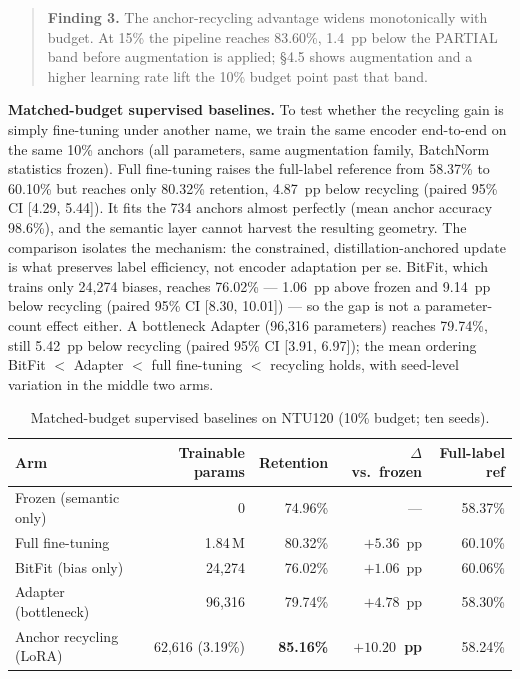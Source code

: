 \documentclass[preprint,12pt,number]{elsarticle}
\begin{document}
\begin{quote}
\textbf{Finding 3.} The anchor-recycling advantage widens monotonically with budget. At
15\% the pipeline reaches 83.60\%, 1.4~pp below the PARTIAL band before
augmentation is applied; \S4.5 shows augmentation and a higher learning
rate lift the 10\% budget point past that band.
\end{quote}

\textbf{Matched-budget supervised baselines.} To test whether the recycling gain
is simply fine-tuning under another name, we train the same encoder
end-to-end on the same 10\% anchors (all parameters, same augmentation
family, BatchNorm statistics frozen). Full fine-tuning raises the
full-label reference from 58.37\% to 60.10\% but reaches only 80.32\%
retention, 4.87~pp below recycling (paired 95\% CI [4.29, 5.44]). It fits the
734 anchors almost perfectly (mean anchor accuracy 98.6\%), and the semantic
layer cannot harvest the resulting geometry. The comparison isolates the
mechanism: the constrained, distillation-anchored update is what preserves
label efficiency, not encoder adaptation per se. BitFit, which trains only
24,274 biases, reaches 76.02\% --- 1.06~pp above frozen and 9.14~pp below
recycling (paired 95\% CI [8.30, 10.01]) --- so the gap is not a parameter-count
effect either. A bottleneck Adapter (96,316 parameters) reaches 79.74\%,
still 5.42~pp below recycling (paired 95\% CI [3.91, 6.97]); the mean ordering
BitFit $<$ Adapter $<$ full fine-tuning $<$ recycling holds, with seed-level
variation in the middle two arms.

\begin{table}[t]
\centering
\caption{Matched-budget supervised baselines on NTU120 (10\% budget; ten
seeds).}
\label{tab:matched}
\small
\begin{tabular}{@{}lrrrr@{}}
\toprule
Arm & Trainable params & Retention & $\Delta$ vs.\ frozen & Full-label ref \\
\midrule
Frozen (semantic only) & 0 & 74.96\% & --- & 58.37\% \\
Full fine-tuning & 1.84\,M & 80.32\% & $+5.36$~pp & 60.10\% \\
BitFit (bias only) & 24,274 & 76.02\% & $+1.06$~pp & 60.06\% \\
Adapter (bottleneck) & 96,316 & 79.74\% & $+4.78$~pp & 58.30\% \\
Anchor recycling (LoRA) & 62,616 (3.19\%) & \textbf{85.16\%} & \textbf{$+10.20$~pp} & 58.24\% \\
\bottomrule
\end{tabular}
\end{table}
\end{document}
